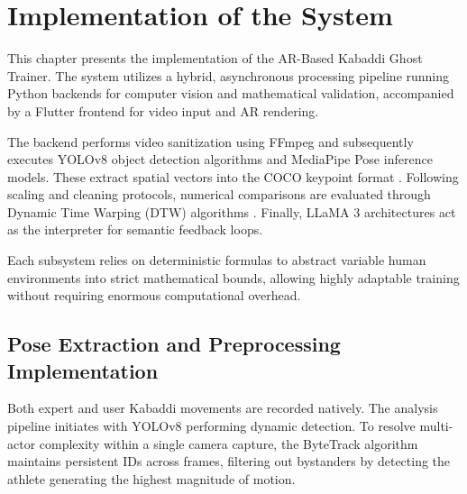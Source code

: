 \chapter{Implementation of the System}
\begin{sloppypar}
\newcommand{\algoheader}[2]{\par\vspace{0.15em}\noindent\rule{\textwidth}{0.4pt}\\[-0.45em]\textbf{Algorithm #1} #2\\[-0.45em]\noindent\rule{\textwidth}{0.4pt}\\[-0.05em]}
\newcommand{\algofooter}{\par\noindent\rule{\textwidth}{0.4pt}\\[0.25em]}

This chapter presents the implementation of the AR-Based Kabaddi Ghost Trainer. The system utilizes a hybrid, asynchronous processing pipeline running Python backends for computer vision and mathematical validation, accompanied by a Flutter frontend for video input and AR rendering.

The backend performs video sanitization using FFmpeg and subsequently executes YOLOv8 object detection algorithms \cite{yolov8_ultralytics} and MediaPipe Pose \cite{mediapipe_pose} inference models. These extract spatial vectors into the COCO keypoint format \cite{lin_coco}. Following scaling and cleaning protocols, numerical comparisons are evaluated through Dynamic Time Warping (DTW) algorithms \cite{dtw_sakoe}. Finally, LLaMA 3 architectures \cite{llama3_touvron} act as the interpreter for semantic feedback loops.

Each subsystem relies on deterministic formulas to abstract variable human environments into strict mathematical bounds, allowing highly adaptable training without requiring enormous computational overhead.

\section{Pose Extraction and Preprocessing Implementation}

Both expert and user Kabaddi movements are recorded natively. The analysis pipeline initiates with YOLOv8 performing dynamic detection. To resolve multi-actor complexity within a single camera capture, the ByteTrack algorithm maintains persistent IDs across frames, filtering out bystanders by detecting the athlete generating the highest magnitude of motion.


\end{sloppypar}
